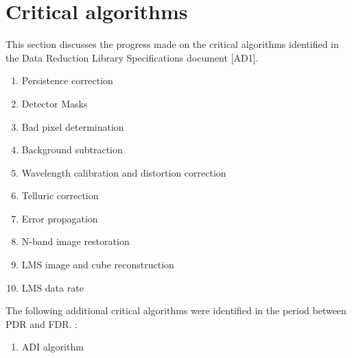 \clearpage
\section{Critical algorithms}\label{sec:critical_algorithms}

This section discusses the progress made on the critical algorithms identified in the Data Reduction Library Specifications document [AD1].

\begin{enumerate}
    \item Persistence correction
    \item Detector Masks
    \item Bad pixel determination
    \item Background subtraction
    \item Wavelength calibration and distortion correction
    \item Telluric correction
    \item Error propagation
    \item N-band image restoration
    \item LMS image and cube reconstruction
    \item LMS data rate   
\end{enumerate}

The following additional critical algorithms were identified in the period between PDR and FDR. :

\begin{enumerate}
    \item ADI algorithm
\end{enumerate}



